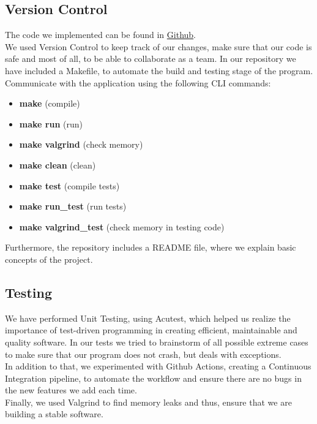 \documentclass{article}
\begin{document}
\subsection{Version Control}
The code we implemented can be found in
\href{https://github.com/NefeliTav/Software-Development-for-Information-Systems}{Github}. \\
We used Version Control to keep track of our changes, make sure that our code is safe and most of all, to be able to collaborate as a team.
In our repository we have included a Makefile, to automate the build and testing stage of the program.  \\ 
Communicate with the application using the following CLI commands:
\begin{itemize}
  \item \textbf{make} (compile)
  \item \textbf{make run} (run)
  \item \textbf{make valgrind} (check memory)
  \item \textbf{make clean} (clean)
  \item \textbf{make test} (compile tests)
  \item \textbf{make run\_test} (run tests)
  \item \textbf{make valgrind\_test} (check memory in testing code)
\end{itemize}
Furthermore, the repository includes a README file, where we explain basic concepts of the project.
\subsection{Testing}
We have performed Unit Testing, using Acutest, which helped us realize the importance of test-driven programming in creating efficient, maintainable and quality software. In our tests we tried to brainstorm of all possible extreme cases to make sure that our program does not crash, but deals with exceptions.\\
In addition to that, we experimented with Github Actions, creating a Continuous Integration pipeline, to automate the workflow and ensure there are no bugs in the new features we add each time.\\
Finally, we used Valgrind to find memory leaks and thus, ensure that we are building a stable software.
\end{document}
